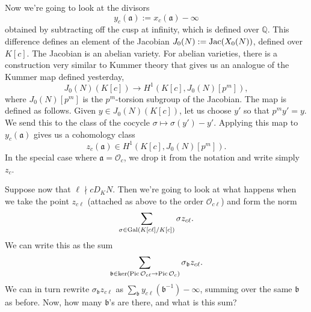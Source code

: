 \documentclass[reqno]{amsart} 
\begin{document}
Now we're going to look at the divisors
\begin{equation*}
  y_c(\mathfrak{a}) := x_c(\mathfrak{a}) - \infty
\end{equation*}
obtained by subtracting off the cusp at infinity, which is defined over $\mathbb{Q}$.  This difference defines an element of the Jacobian $J_0(N) := \operatorname{Jac}(X_0(N))$, defined over $K[c]$.  The Jacobian is an abelian variety.  For abelian varieties, there is a construction very similar to Kummer theory that gives us an analogue of the Kummer map defined yesterday,
\begin{equation*}
  J_0(N)(K[c]) \rightarrow H^1(K[c], J_0(N)[p^m]),
\end{equation*}
where $J_0(N)[p^m]$ is the $p^m$-torsion subgroup of the Jacobian.  The map is defined as follows.  Given $y \in J_0(N)(K[c])$, let us choose $y '$ so that $p^m y' = y$.  We send this to the class of the cocycle $\sigma \mapsto \sigma(y') - y'$.  Applying this map to  $y_c(\mathfrak{a})$ gives us a cohomology class
\begin{equation*}
  z_c(\mathfrak{a}) \in H^1(K[c], J_0(N)[p^m]).
\end{equation*}
In the special case where $\mathfrak{a} = \mathcal{O}_c$, we drop it from the notation and write simply $z_c$.

Suppose now that $\ell \nmid c D_K N$.  Then we're going to look at what happens when we take the point $z_{c \ell}$ (attached as above to the order $\mathcal{O}_{c \ell}$) and form the norm
\begin{equation*}
  \sum_{\sigma \in \operatorname{Gal}(K[c \ell] / K[c])} \sigma z_{c \ell}.
\end{equation*}
We can write this as the sum
\begin{equation*}
  \sum_{\mathfrak{b} \in \ker(\operatorname{Pic} \mathcal{O}_{c \ell} \rightarrow \operatorname{Pic} \mathcal{O}_c)} \sigma_{\mathfrak{b}} z_{c \ell}.
\end{equation*}
We can in turn rewrite $\sigma_{\mathfrak{b}} z_{c \ell}$ as $\sum_{\mathfrak{b}} y_{c \ell}(\mathfrak{b}^{-1}) - \infty$, summing over the same $\mathfrak{b}$ as before.  Now, how many $\mathfrak{b}$'s are there, and what is this sum?
\end{document}
